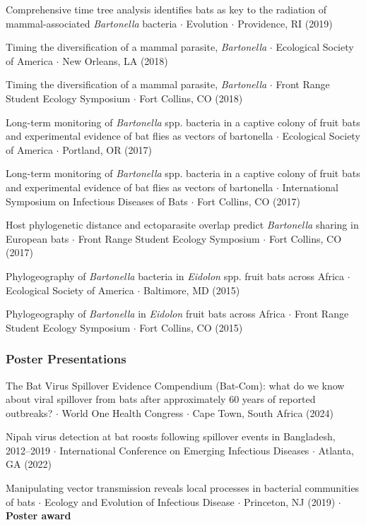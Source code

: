 \documentclass{cv}
\begin{document}
Comprehensive time tree analysis identifies bats as key to the radiation of mammal-associated \textit{Bartonella} bacteria $\cdot$ Evolution $\cdot$ Providence, RI (2019)

Timing the diversification of a mammal parasite, \textit{Bartonella} $\cdot$ Ecological Society of America $\cdot$ New Orleans, LA (2018)

Timing the diversification of a mammal parasite, \textit{Bartonella} $\cdot$ Front Range Student Ecology Symposium $\cdot$ Fort Collins, CO (2018)

Long-term monitoring of \textit{Bartonella} spp. bacteria in a captive colony of fruit bats and experimental evidence of bat flies as vectors of bartonella $\cdot$ Ecological Society of America $\cdot$ Portland, OR (2017)

Long-term monitoring of \textit{Bartonella} spp. bacteria in a captive colony of fruit bats and experimental evidence of bat flies as vectors of bartonella $\cdot$ International Symposium on Infectious Diseases of Bats $\cdot$ Fort Collins, CO (2017)

Host phylogenetic distance and ectoparasite overlap predict \textit{Bartonella} sharing in European bats $\cdot$ Front Range Student Ecology Symposium $\cdot$ Fort Collins, CO (2017)

Phylogeography of \textit{Bartonella} bacteria in \textit{Eidolon} spp. fruit bats across Africa $\cdot$ Ecological Society of America $\cdot$ Baltimore, MD (2015)

Phylogeography of \textit{Bartonella} in \textit{Eidolon} fruit bats across Africa $\cdot$ Front Range Student Ecology Symposium $\cdot$ Fort Collins, CO (2015)

\subsubsection*{Poster Presentations}

The Bat Virus Spillover Evidence Compendium (Bat-Com): what do we know about viral spillover from bats after approximately 60 years of reported outbreaks? $\cdot$ World One Health Congress $\cdot$ Cape Town, South Africa (2024)

Nipah virus detection at bat roosts following spillover events in Bangladesh, 2012--2019 $\cdot$ International Conference on Emerging Infectious Diseases $\cdot$ Atlanta, GA (2022)

Manipulating vector transmission reveals local processes in bacterial communities of bats $\cdot$ Ecology and Evolution of Infectious Disease $\cdot$ Princeton, NJ (2019) $\cdot$ \textbf{Poster award}
\end{document}
